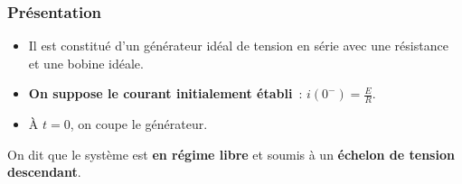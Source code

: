 \documentclass[../../main/main.tex]{subfiles}
\begin{document}
\subsubsection{Présentation}
\noindent
\begin{minipage}[c]{.6\linewidth}
	\begin{itemize}
		\item Il est constitué d'un générateur idéal de tension en série avec une
		      résistance et une bobine idéale.
		\item \textbf{On suppose le courant initialement établi}~: $i(0^-) =
			      \frac{E}{R}$.
		\item À $t=0$, on coupe le générateur.
	\end{itemize}
	On dit que le système est \textbf{en régime libre} et soumis à un
	\textbf{échelon de tension descendant}.
\end{minipage}
\hfill
\end{document}
